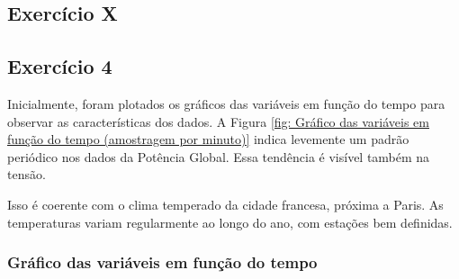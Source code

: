 % 



\subsection{Exercício X}

\subsection{Exercício 4}

Inicialmente, foram plotados os gráficos das variáveis em função do tempo para observar as características dos dados. A Figura \ref{fig: Gráfico das variáveis em função do tempo (amostragem por minuto)} indica levemente um padrão periódico nos dados da Potência Global. Essa tendência é visível também na tensão.

Isso é coerente com o clima temperado da cidade francesa, próxima a Paris. As temperaturas variam regularmente ao longo do ano, com estações bem definidas.

\subsubsection{Gráfico das variáveis em função do tempo}

